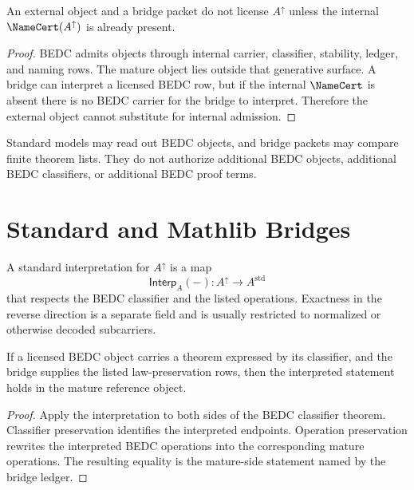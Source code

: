 \begin{theorem}
\label{thm:mature-bridge-spine-no-generation}
An external object and a bridge packet do not license $A^{\uparrow}$ unless
the internal $\NameCert(A^{\uparrow})$ is already present.
\end{theorem}

\begin{proof}
BEDC admits objects through internal carrier, classifier, stability, ledger,
and naming rows.  The mature object lies outside that generative surface.  A
bridge can interpret a licensed BEDC row, but if the internal $\NameCert$ is
absent there is no BEDC carrier for the bridge to interpret.  Therefore the
external object cannot substitute for internal admission.
\end{proof}

\begin{principle}
\label{prin:mature-bridge-spine-interpretation-boundary}
Standard models may read out BEDC objects, and bridge packets may compare
finite theorem lists.  They do not authorize additional BEDC objects,
additional BEDC classifiers, or additional BEDC proof terms.
\end{principle}

\section{Standard and Mathlib Bridges}
\label{sec:mature-bridge-spine-standard-mathlib}

\begin{definition}
\label{def:mature-bridge-spine-standard-interpretation}
A standard interpretation for $A^{\uparrow}$ is a map
$$
\mathsf{Interp}_A(-):A^{\uparrow}\to A^{\mathrm{std}}
$$
that respects the BEDC classifier and the listed operations.  Exactness in the
reverse direction is a separate field and is usually restricted to normalized
or otherwise decoded subcarriers.
\end{definition}

\begin{theorem}
\label{thm:mature-bridge-spine-standard-preservation}
If a licensed BEDC object carries a theorem expressed by its classifier, and
the bridge supplies the listed law-preservation rows, then the interpreted
statement holds in the mature reference object.
\end{theorem}

\begin{proof}
Apply the interpretation to both sides of the BEDC classifier theorem.
Classifier preservation identifies the interpreted endpoints.  Operation
preservation rewrites the interpreted BEDC operations into the corresponding
mature operations.  The resulting equality is the mature-side statement named
by the bridge ledger.
\end{proof}

